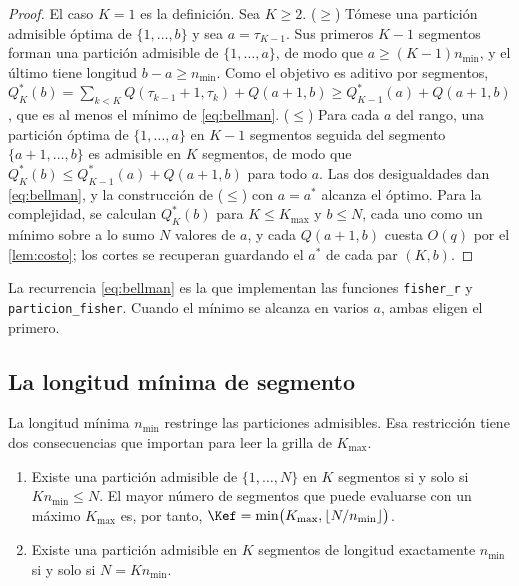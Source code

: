 \begin{proof}
El caso $K=1$ es la definición. Sea $K\ge2$. ($\ge$) Tómese una partición admisible óptima de
$\{1,\dots,b\}$ y sea $a=\tau_{K-1}$. Sus primeros $K-1$ segmentos forman una partición admisible
de $\{1,\dots,a\}$, de modo que $a\ge(K-1)n_{\min}$, y el último tiene longitud $b-a\ge n_{\min}$.
Como el objetivo es aditivo por segmentos,
$Q^\ast_K(b)=\sum_{k<K}Q(\tau_{k-1}+1,\tau_k)+Q(a+1,b)\ge Q^\ast_{K-1}(a)+Q(a+1,b)$, que es al
menos el mínimo de \cref{eq:bellman}. ($\le$) Para cada $a$ del rango, una partición óptima de
$\{1,\dots,a\}$ en $K-1$ segmentos seguida del segmento $\{a+1,\dots,b\}$ es admisible en $K$
segmentos, de modo que $Q^\ast_K(b)\le Q^\ast_{K-1}(a)+Q(a+1,b)$ para todo $a$. Las dos
desigualdades dan \cref{eq:bellman}, y la construcción de ($\le$) con $a=a^\ast$ alcanza el
óptimo. Para la complejidad, se calculan $Q^\ast_K(b)$ para $K\le K_{\max}$ y $b\le N$, cada uno
como un mínimo sobre a lo sumo $N$ valores de $a$, y cada $Q(a+1,b)$ cuesta $O(q)$ por el
\cref{lem:costo}; los cortes se recuperan guardando el $a^\ast$ de cada par $(K,b)$.
\end{proof}

La recurrencia \cref{eq:bellman} es la que implementan las funciones
\texttt{fisher\_r} y \texttt{particion\_fisher}. Cuando el mínimo se alcanza en varios $a$, ambas eligen el primero.

\subsection{La longitud mínima de segmento}
\label{sec:nmin}

La longitud mínima $n_{\min}$ restringe las particiones admisibles. Esa restricción tiene dos
consecuencias que importan para leer la grilla de $K_{\max}$.

\begin{corolario}\label{cor:fisher-factible}
\begin{enumerate}[label=(\alph*)]
  \item Existe una partición admisible de $\{1,\dots,N\}$ en $K$ segmentos si y solo si
    $Kn_{\min}\le N$. El mayor número de segmentos que puede evaluarse con un máximo $K_{\max}$
    es, por tanto, $\Kef=\min\bigl(K_{\max},\lfloor N/n_{\min}\rfloor\bigr)$.
  \item Existe una partición admisible en $K$ segmentos de longitud exactamente $n_{\min}$ si y
    solo si $N=Kn_{\min}$.
\end{enumerate}
\end{corolario}


